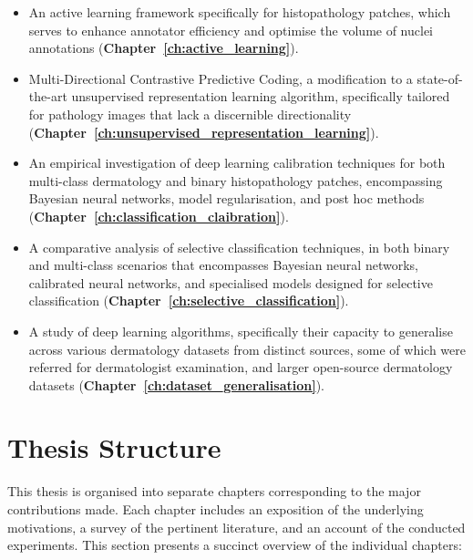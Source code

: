 \begin{itemize}
	
	\item An active learning framework specifically for histopathology patches, which serves to enhance annotator efficiency and optimise the volume of nuclei annotations (\textbf{Chapter~\ref{ch:active_learning}}).
	
	\item Multi-Directional Contrastive Predictive Coding, a modification to a state-of-the-art unsupervised representation learning algorithm, specifically tailored for pathology images that lack a discernible directionality (\textbf{Chapter~\ref{ch:unsupervised_representation_learning}}).
	
	\item An empirical investigation of deep learning calibration techniques for both multi-class dermatology and binary histopathology patches, encompassing Bayesian neural networks, model regularisation, and post hoc methods (\textbf{Chapter~\ref{ch:classification_claibration}}).
	
	\item A comparative analysis of selective classification techniques, in both binary and multi-class scenarios that encompasses Bayesian neural networks, calibrated neural networks, and specialised models designed for selective classification (\textbf{Chapter~\ref{ch:selective_classification}}).
	
	\item A study of deep learning algorithms, specifically their capacity to generalise across various dermatology datasets from distinct sources, some of which were referred for dermatologist examination, and larger open-source dermatology datasets (\textbf{Chapter~\ref{ch:dataset_generalisation}}).
	
\end{itemize}



\section{Thesis Structure}
\label{sec:thesis_structure}
This thesis is organised into separate chapters corresponding to the major contributions made. Each chapter includes an exposition of the underlying motivations, a survey of the pertinent literature, and an account of the conducted experiments. This section presents a succinct overview of the individual chapters:

